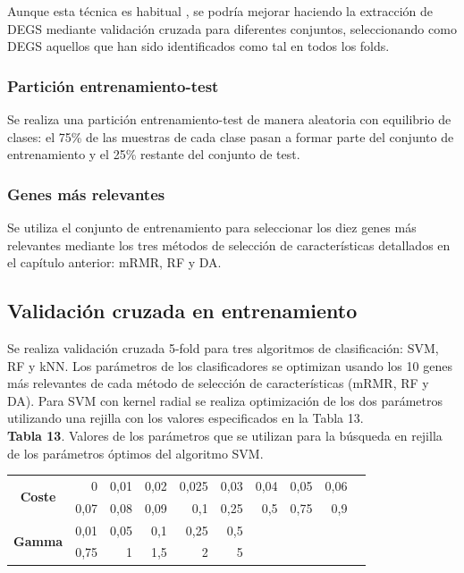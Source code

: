 Aunque esta técnica es habitual \cite{Lee2020}, se podría mejorar haciendo la extracción de DEGS mediante validación cruzada para diferentes conjuntos, seleccionando como DEGS aquellos que han sido identificados como tal en todos los folds.

\subsubsection{Partición entrenamiento-test}

Se realiza una partición entrenamiento-test de manera aleatoria con equilibrio de clases: el 75\% de las muestras de cada clase pasan a formar parte del conjunto de entrenamiento y el 25\% restante del conjunto de test.

\subsubsection{Genes más relevantes}

Se utiliza el conjunto de entrenamiento para seleccionar los diez genes más relevantes mediante los tres métodos de selección de características detallados en el capítulo anterior: mRMR, RF y DA.

\subsection{Validación cruzada en entrenamiento}

Se realiza validación cruzada 5-fold para tres algoritmos de clasificación: SVM, RF y kNN. Los parámetros de los clasificadores se optimizan usando los 10 genes más relevantes de cada método de selección de características (mRMR, RF y DA). Para SVM con kernel radial se realiza optimización de los dos parámetros utilizando una rejilla con los valores especificados en la Tabla 13.\\

\textbf{Tabla 13}. Valores de los parámetros que se utilizan para la búsqueda en rejilla de los parámetros óptimos del algoritmo SVM.

\begin{table}[H]
	\centering
	\begin{tabular}{crrrrrrrrr}
		\hline
		\multirow{2}{*}{\textbf{Coste}} & 0    & 0,01 & 0,02         & 0,025                             & 0,03 & 0,04 & 0,05 & 0,06 \\
		& 0,07 & 0,08 & 0,09         & 0,1                               & 0,25 & 0,5  & 0,75 & 0,9  \\ \hline
		\multirow{2}{*}{\textbf{Gamma}} & 0,01 & 0,05 & 0,1 & 0,25 & 0,5  &      &      &      \\
		& 0,75 & 1    & 1,5          & 2                                 & 5    &      &      &      \\ \hline
	\end{tabular}
\end{table}

